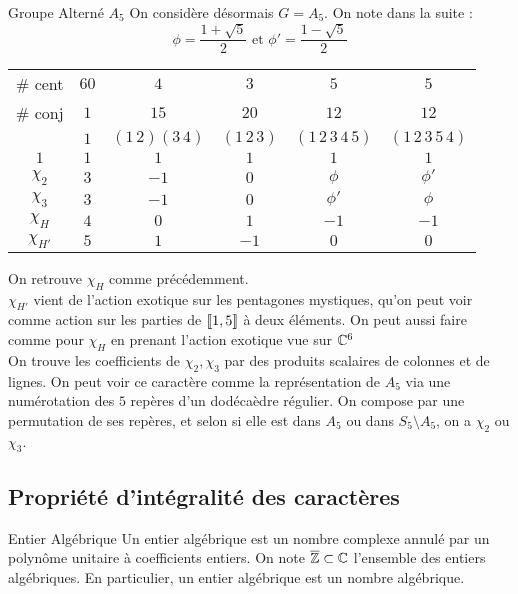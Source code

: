 \documentclass{cours}
\begin{document}
\begin{propositionfr}{Groupe Alterné $A_{5}$}{}
    On considère désormais $G = A_{5}$. On note dans la suite :
    \[
        \phi = \frac{1 +\sqrt{5}}{2} \text{ et } \phi' = \frac{1 - \sqrt{5}}{2}
    \]
    \begin{center}
        \begin{tabular}{c|ccccc}
            \# cent & $60$ & $4$ & $3$ & $5$ & $5$\\
            \# conj & $1$ & $15$ & $20$& $12$ & $12$ \\
            & $1$ & $(1\, 2)(3\, 4)$ & $(1\, 2\, 3)$ & $(1\, 2\, 3\, 4\, 5)$ & $(1\, 2\, 3\, 5\, 4)$\\
            \midrule
            $1$ & $1$ & $1$ & $1$ & $1$ & $1$\\
            $\chi_{2}$ & $3$ & $-1$ & $0$ & $\phi$ & $\phi'$\\
            $\chi_{3}$ & $3$ & $-1$ & $0$ & $\phi'$ & $\phi$\\
            $\chi_{H}$ & $4$ & $0$ & $1$ & $-1$ & $-1$\\
            $\chi_{H'}$ & $5$ & $1$ & $-1$ & $0$ & $0$
        \end{tabular}
    \end{center}
    On retrouve $\chi_{H}$ comme précédemment.\\
    $\chi_{H'}$ vient de l'action exotique sur les pentagones mystiques, qu'on peut voir comme action sur les parties de $\left\llbracket 1, 5\right\rrbracket$ à deux éléments. On peut aussi faire comme pour $\chi_{H}$ en prenant l'action exotique vue sur $\mathbb{C}^{6}$\\
    On trouve les coefficients de $\chi_{2}, \chi_{3}$ par des produits scalaires de colonnes et de lignes. On peut voir ce caractère comme la représentation de $A_{5}$ via une numérotation des $5$ repères d'un dodécaèdre régulier. On compose par une permutation de ses repères, et selon si elle est dans $A_{5}$ ou dans $S_{5}\setminus A_{5}$, on a $\chi_{2}$ ou $\chi_{3}$.
\end{propositionfr}

\subsection{Propriété d'intégralité des caractères}
\begin{définition}{Entier Algébrique}{}
    Un entier algébrique est un nombre complexe annulé par un polynôme unitaire à coefficients entiers. On note $\overline{\mathbb{Z}} \subset \mathbb{C}$ l'ensemble des entiers algébriques. En particulier, un entier algébrique est un nombre algébrique.
\end{définition}
\end{document}

